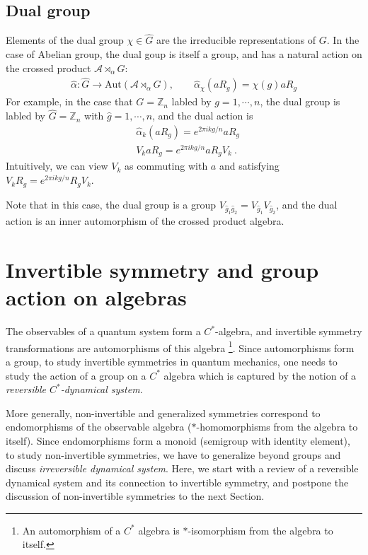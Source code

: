 \documentclass{article}
\newcommand{\mA}{\mathcal{A}}
\newcommand{\nn}{\nonumber}
\theoremstyle{definition}
\begin{document}
  \subsection{Dual group}

  Elements of the dual group $\chi\in \hat{G}$ are the irreducible
  representations of $G$. In the case of Abelian group, the dual goup is itself
  a group, and has a natural action on the crossed product $\mA\rtimes_{\alpha}G$:
  \begin{align}
    \hat{\alpha}:\hat{G}\to \text{Aut}(\mA\rtimes_{\alpha}G), \qquad \hat{\alpha}_{\chi}(a R_{g}) = \chi(g) a R_{g}
  \end{align}
  For example, in the case that $G=\mathbb{Z}_{n}$ labled by $g=1,\cdots, n$,
  the dual group is labled by $\hat{G}=\mathbb{Z}_{n}$ with
  $\hat{g}=1,\cdots, n$, and the dual action is
  \begin{align}
     & \hat{\alpha}_{k}(a R_{g}) = e^{2\pi i k g/n}a R_{g}\nn \\
     & V_{k}a R_{g}=e^{2\pi ik g/n}a R_{g}V_{k}\ .
  \end{align}
  Intuitively, we can view $V_{k}$ as commuting with $a$ and satisfying
  $V_{k}R_{g}=e^{2\pi i k g/n}R_{g}V_{k}$.

  Note that in this case, the dual group is a group $V_{\hat{g}_1\hat{g}_2}=V_{\hat{g}_1}
  V_{\hat{g}_2}$, and the dual action is an inner automorphism of the crossed
  product algebra.

  \section{Invertible symmetry and group action on algebras}

  The observables of a quantum system form a $C^{*}$-algebra, and invertible
  symmetry transformations are automorphisms of this algebra \footnote{An
  automorphism of a $C^{*}$ algebra is $*$-isomorphism from the algebra to
  itself.}. Since automorphisms form a group, to study invertible symmetries in
  quantum mechanics, one needs to study the action of a group on a $C^{*}$ algebra
  which is captured by the notion of a {\it reversible $C^{*}$-dynamical system}.

  More generally, non-invertible and generalized symmetries correspond to
  endomorphisms of the observable algebra ($*$-homomorphisms from the algebra to
  itself). Since endomorphisms form a monoid (semigroup with identity element),
  to study non-invertible symmetries, we have to generalize beyond groups and discuss
  {\it irreversible dynamical system}. Here, we start with a review of a reversible
  dynamical system and its connection to invertible symmetry, and postpone the
  discussion of non-invertible symmetries to the next Section.
\end{document}
